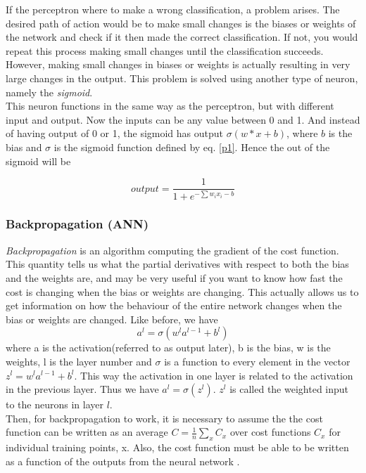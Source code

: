 \documentclass[a4paper,11pt,twocolumn]{article}
\begin{document}
If the perceptron where to make a wrong classification, a problem arises. The desired path of action would be to make small changes is the biases or weights of the network and check if it then made the correct classification. If not, you would repeat this process making small changes until the classification succeeds. However, making small changes in biases or weights is actually resulting in very large changes in the output. This problem is solved using another type of neuron, namely the \textit{sigmoid}. 
\\

This neuron functions in the same way as the perceptron, but with different input and output. Now the inputs can be any value between 0 and 1. And instead of having output of 0 or 1, the sigmoid has output $\sigma(w*x + b)$, where $b$ is the bias and $\sigma$ is the sigmoid function defined by eq. \eqref{p1}. Hence the out of the sigmoid will be \cite{Nielsen} 

\begin{equation}
output = \frac{1}{1 + e^{-\sum w_ix_i-b}}
\end{equation}

\subsubsection{Backpropagation (ANN)}
\textit{Backpropagation} is an algorithm computing the gradient of the cost function. This quantity tells us what the partial derivatives with respect to both the bias and the weights are, and may be very useful if you want to know how fast the cost is changing when the bias or weights are changing. This actually allows us to get information on how the behaviour of the entire network changes when the bias or weights are changed. Like before, we have    
\begin{equation}
a^l = \sigma(w^la^{l-1} + b^l)
\label{al}
\end{equation}
where a is the activation(referred to as output later), b is the bias, w is the weights, l is the layer number and $\sigma$ is a function to every element in the vector $z^l = w^la^{l-1}+b^l$. This way the activation in one layer is related to the activation in the previous layer. Thus we have $a^l = \sigma(z^l)$. $z^l$ is called the weighted input to the neurons in layer $l$. 
\\

Then, for backpropagation to work, it is necessary to assume the the cost function can be written as an average $C = \frac{1}{n}\sum_x C_x$ over cost functions $C_x$ for individual training points, x. Also, the cost function must be able to be written as a function of the outputs from the neural network \cite{Nielsen}. 
\\
\end{document}
